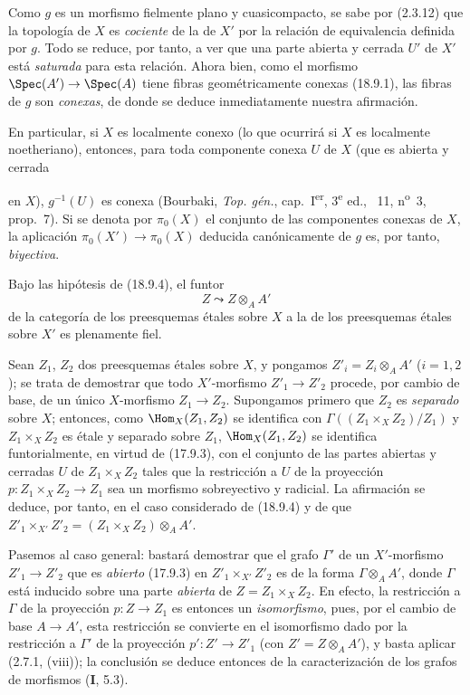 Como $g$ es un morfismo fielmente plano y cuasicompacto, se sabe por (2.3.12) que la topología de $X$ es \emph{cociente} de la de $X'$ por la relación de equivalencia definida por $g$. Todo se reduce, por tanto, a ver que una parte abierta y cerrada $U'$ de $X'$ está \emph{saturada} para esta relación. Ahora bien, como el morfismo $\Spec(A')\to\Spec(A)$ tiene fibras geométricamente conexas (18.9.1), las fibras de $g$ son \emph{conexas}, de donde se deduce inmediatamente nuestra afirmación.

En particular, si $X$ es localmente conexo (lo que ocurrirá si $X$ es localmente noetheriano), entonces, para toda componente conexa $U$ de $X$ (que es abierta y cerrada


en $X$), $g^{-1}(U)$ es conexa (Bourbaki, \emph{Top. gén.}, cap.~I\textsuperscript{er}, 3\textsuperscript{e} ed., \textsection~11, n\textsuperscript{o}~3, prop.~7). Si se denota por $\pi_0(X)$ el conjunto de las componentes conexas de $X$, la aplicación $\pi_0(X')\to\pi_0(X)$ deducida canónicamente de $g$ es, por tanto, \emph{biyectiva}.

\begin{corollary}[18.9.5]
\label{IV.18.9.5}
Bajo las hipótesis de \textup{(18.9.4)}, el funtor
\begin{equation}
  Z\leadsto Z\otimes_A A'
  \tag{18.9.5.1}
  \label{IV.18.9.5.1}
\end{equation}
de la categoría de los preesquemas étales sobre $X$ a la de los preesquemas étales sobre $X'$ es plenamente fiel.
\end{corollary}

Sean $Z_1$, $Z_2$ dos preesquemas étales sobre $X$, y pongamos $Z'_i=Z_i\otimes_A A'$ ($i=1,2$); se trata de demostrar que todo $X'$-morfismo $Z'_1\to Z'_2$ procede, por cambio de base, de un único $X$-morfismo $Z_1\to Z_2$. Supongamos primero que $Z_2$ es \emph{separado} sobre $X$; entonces, como $\Hom_X(Z_1,Z_2)$ se identifica con $\Gamma((Z_1\times_X Z_2)/Z_1)$ y $Z_1\times_X Z_2$ es étale y separado sobre $Z_1$, $\Hom_X(Z_1,Z_2)$ se identifica funtorialmente, en virtud de (17.9.3), con el conjunto de las partes abiertas y cerradas $U$ de $Z_1\times_X Z_2$ tales que la restricción a $U$ de la proyección $p:Z_1\times_X Z_2\to Z_1$ sea un morfismo sobreyectivo y radicial. La afirmación se deduce, por tanto, en el caso considerado de (18.9.4) y de que $Z'_1\times_{X'}Z'_2=(Z_1\times_X Z_2)\otimes_A A'$.

Pasemos al caso general: bastará demostrar que el grafo $\Gamma'$ de un $X'$-morfismo $Z'_1\to Z'_2$ que es \emph{abierto} (17.9.3) en $Z'_1\times_{X'}Z'_2$ es de la forma $\Gamma\otimes_A A'$, donde $\Gamma$ está inducido sobre una parte \emph{abierta} de $Z=Z_1\times_X Z_2$. En efecto, la restricción a $\Gamma$ de la proyección $p:Z\to Z_1$ es entonces un \emph{isomorfismo}, pues, por el cambio de base $A\to A'$, esta restricción se convierte en el isomorfismo dado por la restricción a $\Gamma'$ de la proyección $p':Z'\to Z'_1$ (con $Z'=Z\otimes_A A'$), y basta aplicar (2.7.1, (viii)); la conclusión se deduce entonces de la caracterización de los grafos de morfismos (\textbf I, 5.3).

